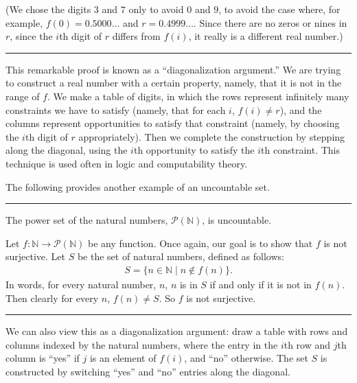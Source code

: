 \documentclass[letterpaper,10pt,english]{sphinxmanual}
\begin{document}
\sphinxAtStartPar
(We chose the digits \(3\) and \(7\) only to avoid \(0\) and \(9\), to avoid the case where, for example, \(f(0) = 0.5000\ldots\) and \(r = 0.4999\ldots\). Since there are no zeros or nines in \(r\), since the \(i\)th digit of \(r\) differs from \(f(i)\), it really is a different real number.)


\bigskip\hrule\bigskip


\sphinxAtStartPar
This remarkable proof is known as a “diagonalization argument.” We are trying to construct a real number with a certain property, namely, that it is not in the range of \(f\). We make a table of digits, in which the rows represent infinitely many constraints we have to satisfy (namely, that for each \(i\), \(f(i) \neq r\)), and the columns represent opportunities to satisfy that constraint (namely, by choosing the \(i\)th digit of \(r\) appropriately). Then we complete the construction by stepping along the diagonal, using the \(i\)th opportunity to satisfy the \(i\)th constraint. This technique is used often in logic and computability theory.

\sphinxAtStartPar
The following provides another example of an uncountable set.


\bigskip\hrule\bigskip


\sphinxAtStartPar
{} The power set of the natural numbers, \({\mathcal P}(\mathbb{N})\), is uncountable.

\sphinxAtStartPar
{} Let \(f : \mathbb{N} \to {\mathcal P}(\mathbb{N})\) be any function. Once again, our goal is to show that \(f\) is not surjective. Let \(S\) be the set of natural numbers, defined as follows:
\begin{equation*}
\begin{split}S = \{ n \in \mathbb{N} \mid n \notin f(n) \}.\end{split}
\end{equation*}
\sphinxAtStartPar
In words, for every natural number, \(n\), \(n\) is in \(S\) if and only if it is not in \(f(n)\). Then clearly for every \(n\), \(f(n) \neq S\). So \(f\) is not surjective.


\bigskip\hrule\bigskip


\sphinxAtStartPar
We can also view this as a diagonalization argument: draw a table with rows and columns indexed by the natural numbers, where the entry in the \(i\)th row and \(j\)th column is “yes” if \(j\) is an element of \(f(i)\), and “no” otherwise. The set \(S\) is constructed by switching “yes” and “no” entries along the diagonal.
\end{document}
